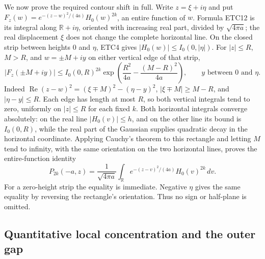 We now prove the required contour shift in full. Write
$z=\xi+i\eta$ and put
$F_z(w)=e^{-(z-w)^2/(4a)}H_0(w)^{2k}$, an entire function
of $w$. Formula ETC12 is its integral along
$\mathbb R+i\eta$, oriented with increasing real part,
divided by $\sqrt{4\pi a}$; the real displacement $\xi$
does not change the complete horizontal line. On the closed
strip between heights $0$ and $\eta$, ETC4 gives
$|H_0(w)|\le I_0(0,|\eta|)$. For $|z|\le R$, $M>R$,
and $w=\pm M+iy$ on either vertical edge of that strip,
\begin{equation}\tag{ETC13}
 |F_z(\pm M+iy)|
 \le I_0(0,R)^{2k}
       \exp\left(\frac{R^2}{4a}-\frac{(M-R)^2}{4a}\right),
 \qquad y\text{ between }0\text{ and }\eta.
\end{equation}
Indeed
$\operatorname{Re}(z-w)^2=(\xi\mp M)^2-(\eta-y)^2$,
$|\xi\mp M|\ge M-R$, and $|\eta-y|\le R$.
Each edge has length at most $R$, so both vertical integrals
tend to zero, uniformly on $|z|\le R$ for each fixed $k$.
Both horizontal integrals converge absolutely: on the real
line $|H_0(v)|\le h$, and on the other line its bound is
$I_0(0,R)$, while the real part of the Gaussian supplies
quadratic decay in the horizontal coordinate. Applying
Cauchy's theorem to this rectangle and letting $M$ tend to
infinity, with the same orientation on the two horizontal
lines, proves the entire-function identity
\begin{equation}\tag{ETC14}
 \boxed{\displaystyle
 P_{2k}(-a,z)=\frac{1}{\sqrt{4\pi a}}\int_{\mathbb R}
              e^{-(z-v)^2/(4a)}H_0(v)^{2k}\,dv.}
\end{equation}
For a zero-height strip the equality is immediate. Negative
$\eta$ gives the same equality by reversing the rectangle's
orientation. Thus no sign or half-plane is omitted.

\subsection{Quantitative local concentration and the outer gap}

